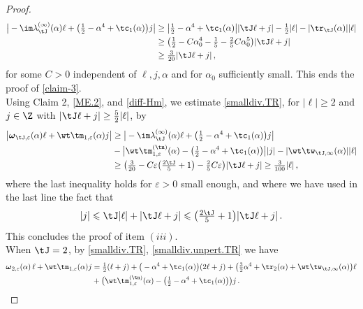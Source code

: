 \documentclass[a4paper,reqno,10pt]{article}
\newcommand{\bomega}{{\boldsymbol{\omega}}}
\begin{document}
\begin{proof}
\begin{equation}
\begin{aligned}
   				\big|  -\im \lambda_{\tJ}^{(\infty)}(\alpha) \ell  + \big( \tfrac12 -\alpha^4 +\tc_{1}(\alpha) \big) j 	  \big| & \geq  \big|\tfrac12 -\alpha^4 + \tc_{1}(\alpha) \big| |\tJ\ell + j| -  \tfrac12 |\ell|- |\tr_{\tJ}(\alpha)| |\ell|  \\
   				& \geq  \big( \tfrac12 - C\alpha_0^4 - \tfrac15  - \tfrac25 C \alpha_0^5 \big) |\tJ\ell + j|  \\
   	            & \geq \tfrac{3}{20}|\tJ \ell + j| \,,
   			\end{aligned}
   		\end{equation}
   		for some  $C>0$ independent of $\ell,j,\alpha$ and for $\alpha_{0}$ sufficiently small. This ends the proof of \eqref{claim-3}.
        \\[1mm]
   	Using Claim 2, \eqref{ME.2}, and \eqref{diff-Hm}, we estimate \eqref{smalldiv.TR}, for $|\ell|\geq 2$ and $j\in\Z$ with  $|\tJ \ell + j|\geq \tfrac52 |\ell|$, by
   	\begin{align}
   		\big| \bomega_{\tJ,\varepsilon}(\alpha)  \ell + \wt\tm_{1,\varepsilon}(\alpha)j \big| &  \geq \big|  -\im \lambda_{\tJ}^{(\infty)}(\alpha) \ell  + \big( \tfrac12 -\alpha^4 +\tc_{1}(\alpha) \big) j 	  \big| \\
        &-  \big| \wt\tm_{1,\varepsilon}^{(\tn)}(\alpha) - \big( \tfrac12 -\alpha^4 + \tc_{1}(\alpha) \big)  \big| |j| - |\wt\tw_{\tJ,\infty}(\alpha)| |\ell|  \\
   		& \geq \big( \tfrac{3}{20} - C\varepsilon\big(\tfrac{2\tJ}{5}+1\big)  - \tfrac25 C\varepsilon \big)|\tJ\ell+j| \geq \tfrac{3}{100}|\ell|  \,,
   	\end{align}
   	where the last inequality holds for $\varepsilon>0$ small enough, and where we have used in the last line the fact that
    $$
    |j|\leqslant \tJ|\ell|+|\tJ\ell+j|\leqslant \big(\tfrac{2\tJ}{5}+1\big)|\tJ\ell+j|\,.
    $$
    This concludes the proof of item $(iii)$.
    \\[1mm]
     When $\tJ=2$, by \eqref{smalldiv.TR}, \eqref{smalldiv.unpert.TR} we have
    \begin{align}
        \bomega_{2,\varepsilon}(\alpha)\,\ell + \wt\tm_{1,\varepsilon}(\alpha) j & = \tfrac12 (\ell + j) + \big( -\alpha^4 + \tc_1(\alpha) \big) (2\ell + j) + \big( \tfrac32 \alpha^4 + \tr_{2}(\alpha) +\wt\tw_{\tJ,\infty}(\alpha) \big)\ell  \\
        &  + \big( \wt\tm_{1,\varepsilon}^{(\tn)}(\alpha) - \big( \tfrac12 -\alpha^4 + \tc_{1}(\alpha) \big)  \big)j \,. 

\end{align}
\end{proof}
\end{document}
